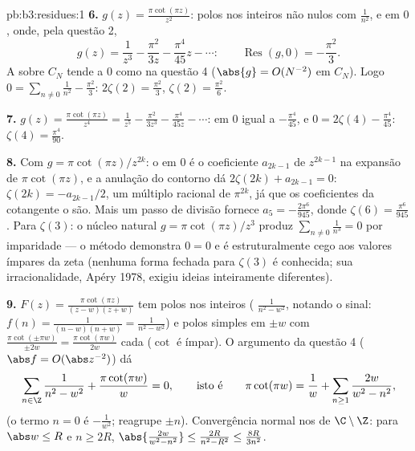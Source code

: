 \begin{solution}{pb:b3:residues:1}
\textbf{6.} $g(z) = \frac{\pi\cot(\pi z)}{z^2}$: polos nos
inteiros não nulos com  $\frac1{n^2}$, e em $0$,
onde, pela questão 2,
\[
g(z) = \frac1{z^3} - \frac{\pi^2}{3z} - \frac{\pi^4}{45}z -
\cdots :
\qquad \operatorname{Res}(g, 0) = -\frac{\pi^2}3 .
\]
A  sobre $C_N$ tende a $0$ como na questão 4
($\abs{g} = O(N^{-2})$ em $C_N$). Logo $0 =
\sum_{n\neq0}\frac1{n^2} - \frac{\pi^2}3$: $2\zeta(2) =
\frac{\pi^2}3$, $\zeta(2) = \frac{\pi^2}6$.

\textbf{7.} $g(z) = \frac{\pi\cot(\pi z)}{z^4} = \frac1{z^5}
- \frac{\pi^2}{3z^3} - \frac{\pi^4}{45z} - \cdots$: 
em $0$ igual a $-\frac{\pi^4}{45}$, e $0 =
2\zeta(4) - \frac{\pi^4}{45}$: $\zeta(4) =
\frac{\pi^4}{90}$.

\textbf{8.} Com $g = \pi\cot(\pi z)/z^{2k}$: o  em
$0$ é o coeficiente $a_{2k-1}$ de $z^{2k-1}$ na
expansão de $\pi\cot(\pi z)$, e a anulação do contorno dá
$2\zeta(2k) + a_{2k-1} = 0$: $\zeta(2k) = -a_{2k-1}/2$, um
múltiplo racional de $\pi^{2k}$, já que os coeficientes da cotangente
o são. Mais um passo de divisão fornece $a_5 =
-\frac{2\pi^6}{945}$, donde $\zeta(6) = \frac{\pi^6}{945}$.
Para $\zeta(3)$: o núcleo natural $g = \pi\cot(\pi z)/z^3$
produz $\sum_{n\neq0}\frac1{n^3} = 0$ por imparidade --- o
método demonstra $0 = 0$ e é estruturalmente cego aos valores
ímpares da zeta (nenhuma forma fechada para $\zeta(3)$ é conhecida; sua
irracionalidade, Apéry 1978, exigiu ideias inteiramente
diferentes).

\textbf{9.} $F(z) = \frac{\pi\cot(\pi z)}{(z - w)(z + w)}$
tem polos nos inteiros ( $\frac1{n^2 - w^2}$,
notando o sinal: $f(n) = \frac1{(n-w)(n+w)} = \frac1{n^2 -
w^2}$) e polos simples em $\pm w$ com 
$\frac{\pi\cot(\pm\pi w)}{\pm2w} = \frac{\pi\cot(\pi
w)}{2w}$ cada ($\cot$ é ímpar). O argumento da questão 4
($\abs f = O(\abs z^{-2})$) dá
\[
\sum_{n\in\Z}\frac1{n^2 - w^2} + \frac{\pi\cot(\pi w)}{w} =
0,
\qquad\text{isto é}\qquad
\pi\cot(\pi w) = \frac1w + \sum_{n\geq1}\frac{2w}{w^2 -
n^2},
\]
(o termo $n = 0$ é $-\frac1{w^2}$; reagrupe $\pm n$). Convergência
normal nos  de $\C\setminus\Z$: para $\abs w \leq
R$ e $n \geq 2R$, $\abs{\frac{2w}{w^2 - n^2}} \leq
\frac{2R}{n^2 - R^2} \leq \frac{8R}{3n^2}$.


\end{solution}
